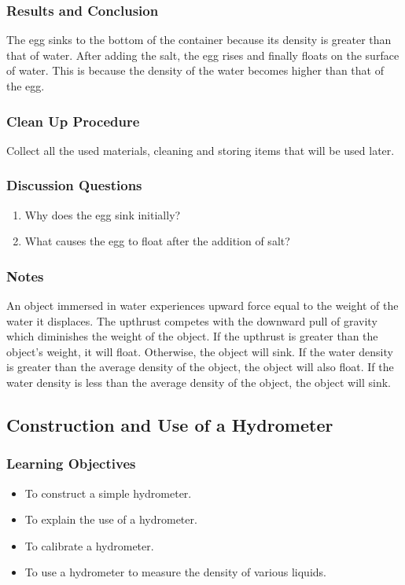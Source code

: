 \subsubsection*{Results and Conclusion}
The egg sinks to the bottom of the container because its density is greater than that of water. After adding the salt, the egg rises and finally floats on the surface of water. This is because the density of the water becomes higher than that of the egg.  

\subsubsection*{Clean Up Procedure}
Collect all the used materials, cleaning and storing items that will be used later.

\subsubsection*{Discussion Questions}
\begin{enumerate}
\item{Why does the egg sink initially?}
\item{What causes the egg to float after the addition of salt?}
\end{enumerate}

\subsubsection*{Notes}
An object immersed in water experiences upward force equal to the weight of the water it displaces. The upthrust competes with the downward pull of gravity which diminishes the weight of the object. If the upthrust is greater than the object's weight, it will float. Otherwise, the object will sink. If the water density is greater than the average density of the object, the object will also float. If the water density is less than the average density of the object, the object will sink.  






\subsection{Construction and Use of a Hydrometer}

\subsubsection*{Learning Objectives}
\begin{itemize}
\item{To construct a simple hydrometer.} 
\item{To explain the use of a hydrometer.} 
\item{To calibrate a hydrometer.} 
\item{To use a hydrometer to measure the density of various liquids.} 
\end{itemize}

